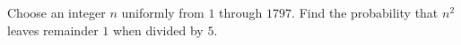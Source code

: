 Choose an integer $n$ uniformly from $1$ through $1797$. Find the probability that $n^2$ leaves remainder $1$ when divided by $5$.
